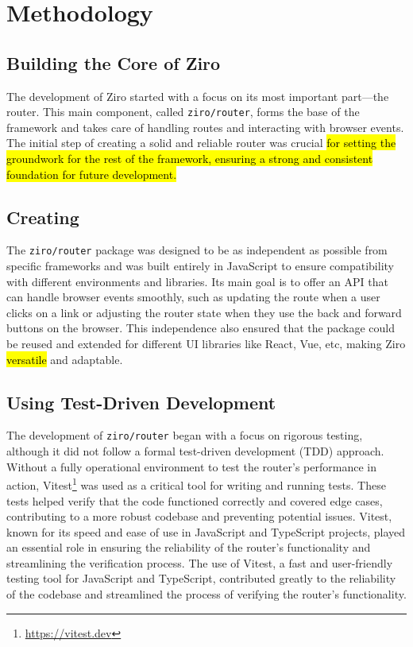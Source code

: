 \section{Methodology} %

\subsection{Building the Core of Ziro}
The development of Ziro started with a focus on its most important part—the router. This main component, called \texttt{ziro/router}, forms the base of the framework and takes care of handling routes and interacting with browser events. The initial step of creating a solid and reliable router was crucial \hl{for setting the groundwork for the rest of the framework, ensuring a strong and consistent foundation for future development.}

\subsection{Creating }
The \texttt{ziro/router} package was designed to be as independent as possible from specific frameworks and was built entirely in JavaScript to ensure compatibility with different environments and libraries. Its main goal is to offer an API that can handle browser events smoothly, such as updating the route when a user clicks on a link or adjusting the router state when they use the back and forward buttons on the browser. This independence also ensured that the package could be reused and extended for different UI libraries like React, Vue, etc, making Ziro \hl{versatile} and adaptable.

\subsection{Using Test-Driven Development}
The development of \texttt{ziro/router} began with a focus on rigorous testing, although it did not follow a formal test-driven development (TDD) approach. Without a fully operational environment to test the router's performance in action, Vitest\footnote{\url{https://vitest.dev}} was used as a critical tool for writing and running tests. These tests helped verify that the code functioned correctly and covered edge cases, contributing to a more robust codebase and preventing potential issues. Vitest, known for its speed and ease of use in JavaScript and TypeScript projects, played an essential role in ensuring the reliability of the router's functionality and streamlining the verification process. The use of Vitest, a fast and user-friendly testing tool for JavaScript and TypeScript, contributed greatly to the reliability of the codebase and streamlined the process of verifying the router's functionality.


